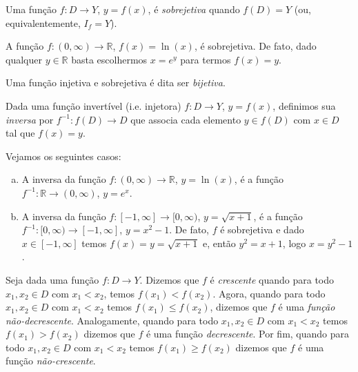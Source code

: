 \begin{defn}
  Uma função $f:D\to Y$, $y=f(x)$, é \emph{sobrejetiva} quando $f(D) = Y$ (ou, equivalentemente, $I_f = Y$).
\end{defn}

\begin{ex}
  A função $f:(0, \infty)\to\mathbb{R}$, $f(x) = \ln(x)$, é sobrejetiva. De fato, dado qualquer $y\in\mathbb{R}$ basta escolhermos $x = e^y$ para termos $f(x) = y$.
\end{ex}

\begin{obs}
  Uma função injetiva e sobrejetiva é dita ser \emph{bijetiva}.
\end{obs}

\begin{defn}
  Dada uma função invertível (i.e. injetora) $f:D\to Y$, $y=f(x)$, definimos sua \emph{inversa} por $f^{-1}:f(D)\to D$ que associa cada elemento $y\in f(D)$ com $x\in D$ tal que $f(x) = y$. 
\end{defn}

\begin{ex}
  Vejamos os seguintes casos:
  \begin{enumerate}[a)]
  \item A inversa da função $f:(0, \infty)\to \mathbb{R}$, $y = \ln(x)$, é a função $f^{-1}:\mathbb{R}\to (0, \infty)$, $y = e^{x}$.
  \item A inversa da função $f:[-1, \infty]\to [0, \infty)$, $y = \sqrt{x+1}$, é a função $f^{-1}:[0, \infty)\to [-1, \infty]$, $y = x^2 -1$. De fato, $f$ é sobrejetiva e dado $x\in [-1, \infty]$ temos $f(x) = y = \sqrt{x+1}$ e, então $y^2 = x + 1$, logo $x = y^2 - 1$.
  \end{enumerate}
\end{ex}

\begin{defn}
  Seja dada uma função $f:D\to Y$. Dizemos que $f$ é \emph{crescente} quando para todo $x_1, x_2\in D$ com $x_1 < x_2$, temos $f(x_1) < f(x_2)$. Agora, quando para todo $x_1, x_2 \in D$ com $x_1 < x_2$ temos $f(x_1) \leq f(x_2)$, dizemos que $f$ é uma \emph{função não-decrescente}. Analogamente, quando para todo $x_1, x_2 \in D$ com $x_1 < x_2$ temos $f(x_1) > f(x_2)$ dizemos que $f$ é uma função \emph{decrescente}. Por fim, quando para todo $x_1, x_2 \in D$ com $x_1 < x_2$ temos $f(x_1) \geq f(x_2)$ dizemos que $f$ é uma função \emph{não-crescente}.
\end{defn}

